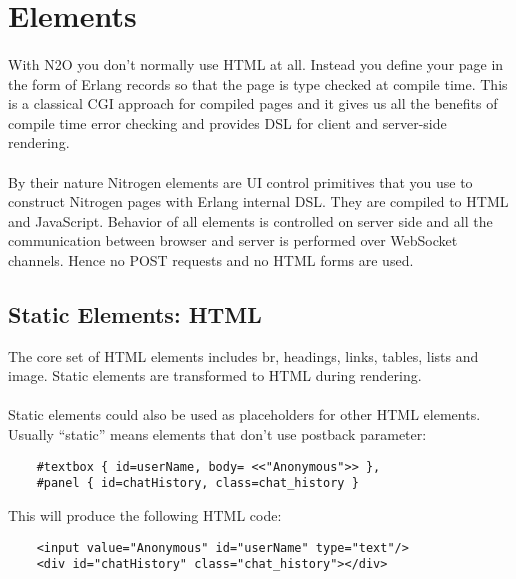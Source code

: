 \section{Elements}

\paragraph{}
With N2O you don't normally use HTML at all. Instead you define your page
in the form of Erlang records so that the page is type checked at compile time.
This is a classical CGI approach for compiled pages and it gives us all the benefits of
compile time error checking and provides DSL for client and server-side rendering.

\paragraph{}
By their nature Nitrogen elements are UI control primitives
that you use to construct Nitrogen pages with Erlang internal DSL.
They are compiled to HTML and JavaScript.
Behavior of all elements is controlled on server side and all the communication
between browser and server is performed over WebSocket channels.
Hence no POST requests and no HTML forms are used.

\subsection{Static Elements: HTML}
The core set of HTML elements includes br, headings, links, tables, lists and image.
Static elements are transformed to HTML during rendering.

\paragraph{}
Static elements could also be used as placeholders for other HTML elements.
Usually ``static'' means elements that don't use postback parameter:

\vspace{1\baselineskip}
\begin{lstlisting}
    #textbox { id=userName, body= <<"Anonymous">> },
    #panel { id=chatHistory, class=chat_history }
\end{lstlisting}
\vspace{1\baselineskip}

This will produce the following HTML code:
\vspace{1\baselineskip}
\begin{lstlisting}
    <input value="Anonymous" id="userName" type="text"/>
    <div id="chatHistory" class="chat_history"></div>
\end{lstlisting}

